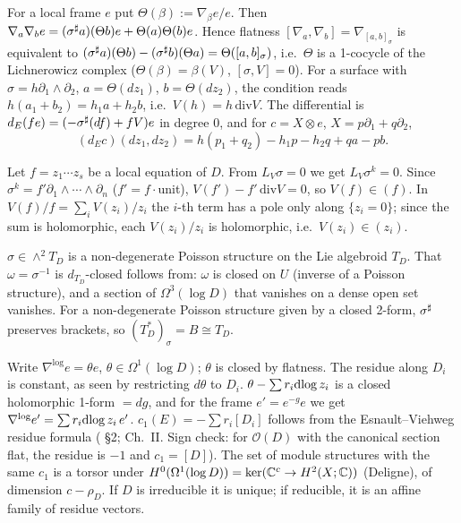 \begin{lem}\tP\label{lem:flat}
For a local frame $e$ put $\Theta(\beta):=\nabla_\beta e/e$. Then $\nabla_a\nabla_be=(\sigma^\sharp a)(\Theta b)e+\Theta(a)\Theta(b)e$. Hence flatness $[\nabla_a,\nabla_b]=\nabla_{[a,b]_\sigma}$ is equivalent to $(\sigma^\sharp a)(\Theta b)-(\sigma^\sharp b)(\Theta a)=\Theta([a,b]_\sigma)$, i.e.\ $\Theta$ is a 1-cocycle of the Lichnerowicz complex ($\Theta(\beta)=\beta(V)$, $[\sigma,V]=0$). For a surface with $\sigma=h\partial_1\wedge\partial_2$, $a=\Theta(dz_1)$, $b=\Theta(dz_2)$, the condition reads $h(a_1+b_2)=h_1a+h_2b$, i.e.\ $V(h)=h\,\mathrm{div}V$. The differential is $d_E(fe)=(-\sigma^\sharp(df)+fV)e$ in degree $0$, and for $c=X\otimes e$, $X=p\partial_1+q\partial_2$,
\begin{equation}\label{eq:dE}
(d_Ec)(dz_1,dz_2)=h(p_1+q_2)-h_1p-h_2q+qa-pb.
\end{equation}
\end{lem}
\begin{lem}[$V$ is logarithmic]\tP\label{lem:log}
Let $f=z_1\cdots z_s$ be a local equation of $D$. From $L_V\sigma=0$ we get $L_V\sigma^k=0$. Since $\sigma^k=f'\partial_1\wedge\cdots\wedge\partial_n$ ($f'=f\cdot$unit), $V(f')-f'\,\mathrm{div}V=0$, so $V(f)\in(f)$. In $V(f)/f=\sum_iV(z_i)/z_i$ the $i$-th term has a pole only along $\{z_i=0\}$; since the sum is holomorphic, each $V(z_i)/z_i$ is holomorphic, i.e.\ $V(z_i)\in(z_i)$.
\end{lem}
\begin{lem}\tP\label{lem:iso}
$\sigma\in\wedge^2T_D$ is a non-degenerate Poisson structure on the Lie algebroid $T_D$. That $\omega=\sigma^{-1}$ is $d_{T_D}$-closed follows from: $\omega$ is closed on $U$ (inverse of a Poisson structure), and a section of $\Omega^3(\log D)$ that vanishes on a dense open set vanishes. For a non-degenerate Poisson structure given by a closed 2-form, $\sigma^\sharp$ preserves brackets, so $(T_D^*)_\sigma=B\cong T_D$.
\end{lem}
\begin{lem}\tP \tC\label{lem:res}
Write $\nabla^{\log}e=\theta e$, $\theta\in\Omega^1(\log D)$; $\theta$ is closed by flatness. The residue along $D_i$ is constant, as seen by restricting $d\theta$ to $D_i$. $\theta-\sum r_i\mathrm{dlog}\, z_i$ is a closed holomorphic 1-form $=dg$, and for the frame $e'=e^{-g}e$ we get $\nabla^{\log}e'=\sum r_i\mathrm{dlog}\, z_i\,e'$. $c_1(E)=-\sum r_i[D_i]$ follows from the Esnault--Viehweg residue formula (\tC \cite{EV} \S2; \cite{Del} Ch.~II. Sign check: for $\mathcal O(D)$ with the canonical section flat, the residue is $-1$ and $c_1=[D]$). The set of module structures with the same $c_1$ is a torsor under $H^0(\Omega^1(\log D))=\ker(\mathbb C^c\to H^2(X;\mathbb C))$ (Deligne), of dimension $c-\rho_D$. If $D$ is irreducible it is unique; if reducible, it is an affine family of residue vectors.
\end{lem}
